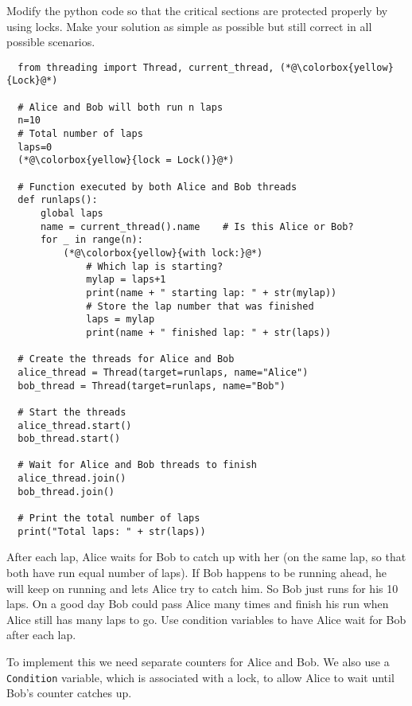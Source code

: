 \documentclass{article}
\begin{document}
\begin{enumerate}[label=\textbf{\makebox[1cm][l]{\Huge\text{(\stylishfont\alph*)}}}, leftmargin=!, labelindent=0pt]

  \item Modify the python code so that the critical sections are
  protected properly by using locks. Make your solution as simple
  as possible but still correct in all possible scenarios. \newline



\begin{lstlisting}
  from threading import Thread, current_thread, (*@\colorbox{yellow}{Lock}@*)

  # Alice and Bob will both run n laps
  n=10
  # Total number of laps
  laps=0
  (*@\colorbox{yellow}{lock = Lock()}@*)
  
  # Function executed by both Alice and Bob threads
  def runlaps():
      global laps
      name = current_thread().name    # Is this Alice or Bob?
      for _ in range(n):
          (*@\colorbox{yellow}{with lock:}@*)
              # Which lap is starting?
              mylap = laps+1
              print(name + " starting lap: " + str(mylap))
              # Store the lap number that was finished
              laps = mylap
              print(name + " finished lap: " + str(laps))
  
  # Create the threads for Alice and Bob
  alice_thread = Thread(target=runlaps, name="Alice")
  bob_thread = Thread(target=runlaps, name="Bob")
  
  # Start the threads
  alice_thread.start()
  bob_thread.start()
  
  # Wait for Alice and Bob threads to finish
  alice_thread.join()
  bob_thread.join()
  
  # Print the total number of laps
  print("Total laps: " + str(laps))  
\end{lstlisting}

\newpage
\item After each lap, Alice waits for Bob to catch up with her
(on the same lap, so that both have run equal number of laps).
If Bob happens to be running ahead, he will keep on running
and lets Alice try to catch him. So Bob just runs for his 10 laps.
On a good day Bob could pass Alice many times and finish his run
when Alice still has many laps to go. Use condition variables
to have Alice wait for Bob after each lap.\newline


To implement this we need separate counters for Alice and Bob.
We also use a \texttt{Condition} variable, which is associated
with a lock, to allow Alice to wait until Bob's counter catches up.


\end{enumerate}
\end{document}
